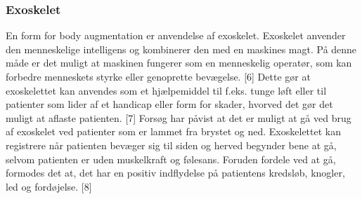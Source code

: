 \subsubsection{Exoskelet}
En form for body augmentation er anvendelse af exoskelet. Exoskelet  anvender den menneskelige intelligens og kombinerer den med en maskines magt. På denne måde er det muligt at maskinen fungerer som en menneskelig operatør, som kan forbedre menneskets styrke eller genoprette bevægelse. [6] Dette gør at exoskelettet kan anvendes som et hjælpemiddel til f.eks. tunge løft eller til patienter som lider af et handicap eller form for skader, hvorved det gør det muligt at aflaste patienten. [7] Forsøg har påvist at det er muligt at gå ved brug af exoskelet ved patienter som er lammet fra brystet og ned. Exoskelettet kan registrere når patienten bevæger sig til siden og herved begynder bene at gå, selvom patienten er uden muskelkraft og følesans. Foruden fordele ved at gå, formodes det at, det har en positiv indflydelse på patientens kredsløb, knogler, led og fordøjelse. [8]


